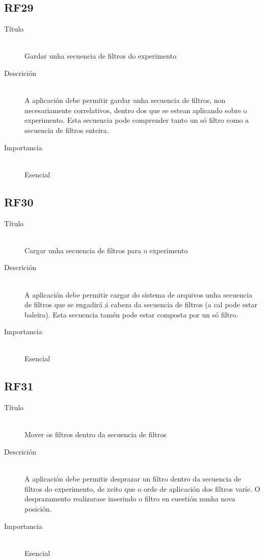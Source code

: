 \subsection*{RF29}
\begin{description}
\item[Título] \hfill \\
Gardar unha secuencia de filtros do experimento
\item[Descrición] \hfill \\
A aplicación debe permitir gardar unha secuencia de filtros, non necesariamente correlativos, dentro dos que se estean aplicando sobre o experimento. Esta secuencia pode comprender tanto un só filtro como a secuencia de filtros enteira.
\item[Importancia] \hfill \\
Esencial
\end{description}

\subsection*{RF30}
\begin{description}
\item[Título] \hfill \\
Cargar unha secuencia de filtros para o experimento
\item[Descrición] \hfill \\
A aplicación debe permitir cargar do sistema de arquivos unha secuencia de filtros que se engadirá á cabeza da secuencia de filtros (a cal pode estar baleira). Esta secuencia tamén pode estar composta por un só filtro.
\item[Importancia] \hfill \\
Esencial
\end{description}

\subsection*{RF31}
\begin{description}
\item[Título] \hfill \\
Mover os filtros dentro da secuencia de filtros
\item[Descrición] \hfill \\
A aplicación debe permitir desprazar un filtro dentro da secuencia de filtros do experimento, de xeito que o orde de aplicación dos filtros varíe. O desprazamento realizarase inserindo o filtro en cuestión nunha nova posición.
\item[Importancia] \hfill \\
Esencial
\end{description}

